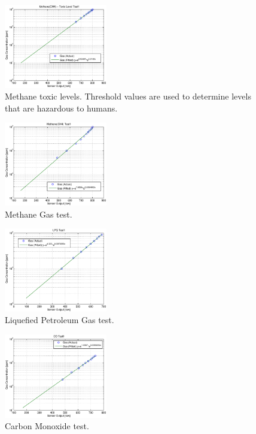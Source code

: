 \begin{figure}
	\centering
	\includegraphics[width=0.4\textwidth]{./matlab/MethaneToxic.eps}
	\caption{Methane toxic levels. Threshold values are used to determine levels that are hazardous to humans.}
	\label{fig:methanetoxic}
\end{figure}

\begin{figure}
	\centering
	\includegraphics[width=0.4\textwidth]{./matlab/MethaneTest1.eps}
	\caption{Methane Gas test.}
	\label{fig:methanetest}
\end{figure}

\begin{figure}
	\centering
	\includegraphics[width=0.4\textwidth]{./matlab/LPG.eps}
	\caption{Liquefied Petroleum Gas test.}
	\label{fig:lpg}
\end{figure}

\begin{figure}
	\centering
	\includegraphics[width=0.4\textwidth]{./matlab/COTest1.eps}
	\caption{Carbon Monoxide test.}
	\label{fig:co}
\end{figure}

